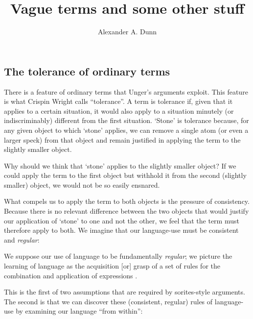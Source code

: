 \documentclass[11pt]{standalone}
\title{Vague terms and some other stuff}
\author{Alexander A. Dunn}
\newenvironment{squote}{%
\begin{spacing}{1}
       	\begin{list}{}{%
\setlength{\labelwidth}{0pt}%
\rightmargin\leftmargin%
}
\item\relax
}{%
\end{list}%
\end{spacing}
}
\begin{document}
\ifstandalone
\maketitle
\begin{spacing}{1.5}
\fi

\section{The tolerance of ordinary terms}
There is a feature of ordinary terms that Unger's arguments exploit.
This feature is what Crispin Wright calls ``tolerance''.  A term is
tolerance if, given that it applies to a certain situation, it would
also apply to a situation minutely (or indiscriminably) different from
the first situation.  `Stone' is tolerance because, for any given
object to which `stone' applies, we can remove a single atom (or even
a larger speck) from that object and remain justified in applying the
term to the slightly smaller object.

Why should we think that `stone' applies to the slightly smaller
object?  If we could apply the term to the first object but withhold
it from the second (slightly smaller) object, we would not be so
easily ensnared.

What compels us to apply the term to both objects is the pressure of
consistency.  Because there is no relevant difference between the two
objects that would justify our application of `stone' to one and not
the other, we feel that the term must therefore apply to both.  We
imagine that our language-use must be consistent and {\em regular}:

\begin{squote}
We suppose our use of language to be fundamentally {\em regular}; we
picture the learning of language as the acquisition [or] grasp of a
set of rules for the combination and application of expressions
\citep[326]{wright1975}.
\end{squote}

This is the first of two assumptions that are required by
sorites-style arguments.  The second is that we can discover these
(consistent, regular) rules of language-use by examining our language
``from within'':


\end{spacing}
\end{document}
